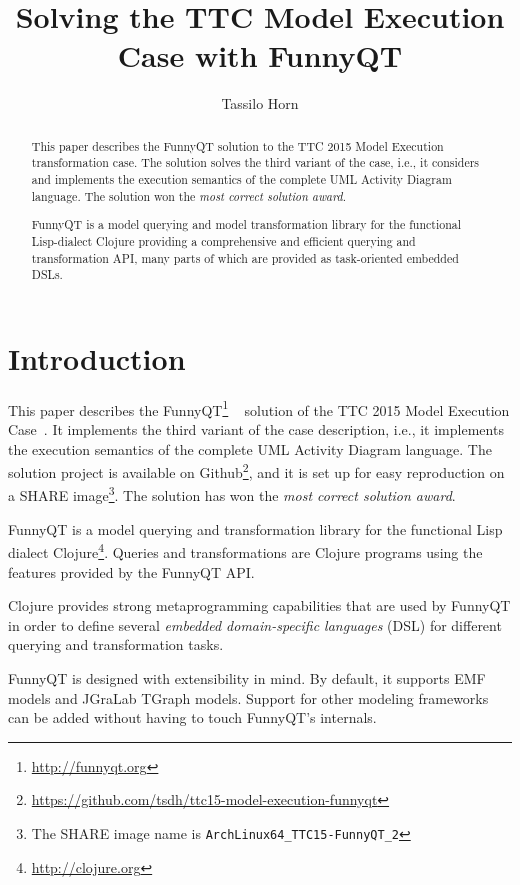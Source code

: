 \documentclass[submission]{eptcs}
\title{Solving the TTC Model Execution Case with FunnyQT}
\author{Tassilo Horn
  \institute{Institute for Software Technology, University Koblenz-Landau, Germany}
  \email{horn@uni-koblenz.de}}
\begin{document}
\maketitle

\begin{abstract}
  This paper describes the FunnyQT solution to the TTC 2015 Model Execution
  transformation case.  The solution solves the third variant of the case,
  i.e., it considers and implements the execution semantics of the complete UML
  Activity Diagram language.  The solution won the \emph{most correct solution
    award}.

  FunnyQT is a model querying and model transformation library for the
  functional Lisp-dialect Clojure providing a comprehensive and efficient
  querying and transformation API, many parts of which are provided as
  task-oriented embedded DSLs.
\end{abstract}


\section{Introduction}
\label{sec:introduction}

This paper describes the FunnyQT\footnote{\url{http://funnyqt.org}}
~\cite{Horn2013MQWFQ,funnyqt-icgt15} solution of the TTC 2015 Model Execution
Case~\cite{model-execution-case-desc}.  It implements the third variant of the
case description, i.e., it implements the execution semantics of the complete
UML Activity Diagram language.  The solution project is available on
Github\footnote{\url{https://github.com/tsdh/ttc15-model-execution-funnyqt}},
and it is set up for easy reproduction on a SHARE image\footnote{The SHARE
  image name is \verb|ArchLinux64_TTC15-FunnyQT_2|}.  The solution has won the
\emph{most correct solution award}.

FunnyQT is a model querying and transformation library for the functional Lisp
dialect Clojure\footnote{\url{http://clojure.org}}.  Queries and
transformations are Clojure programs using the features provided by the FunnyQT
API.

Clojure provides strong metaprogramming capabilities that are used by FunnyQT
in order to define several \emph{embedded domain-specific languages} (DSL) for
different querying and transformation tasks.

FunnyQT is designed with extensibility in mind.  By default, it supports EMF
models and JGraLab TGraph models.  Support for other modeling frameworks can be
added without having to touch FunnyQT's internals.
\end{document}
